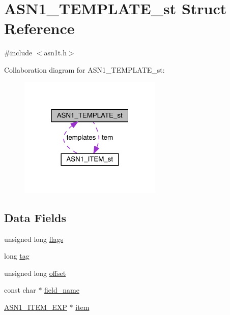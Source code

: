 \hypertarget{struct_a_s_n1___t_e_m_p_l_a_t_e__st}{}\section{A\+S\+N1\+\_\+\+T\+E\+M\+P\+L\+A\+T\+E\+\_\+st Struct Reference}
\label{struct_a_s_n1___t_e_m_p_l_a_t_e__st}


{\ttfamily \#include $<$asn1t.\+h$>$}



Collaboration diagram for A\+S\+N1\+\_\+\+T\+E\+M\+P\+L\+A\+T\+E\+\_\+st\+:\nopagebreak
\begin{figure}[H]
\begin{center}
\leavevmode
\includegraphics[width=193pt]{struct_a_s_n1___t_e_m_p_l_a_t_e__st__coll__graph}
\end{center}
\end{figure}
\subsection*{Data Fields}
\begin{DoxyCompactItemize}
\item 
unsigned long \hyperlink{struct_a_s_n1___t_e_m_p_l_a_t_e__st_a9e339c2784bd040b26a5112866700bff}{flags}
\item 
long \hyperlink{struct_a_s_n1___t_e_m_p_l_a_t_e__st_ae10c29173f0af40507d7e787905c7130}{tag}
\item 
unsigned long \hyperlink{struct_a_s_n1___t_e_m_p_l_a_t_e__st_ac1369a1f209735864674d22517edfa76}{offset}
\item 
const char $\ast$ \hyperlink{struct_a_s_n1___t_e_m_p_l_a_t_e__st_a40e17d0dbb56e424e8512e1da655be9f}{field\+\_\+name}
\item 
\hyperlink{crypto_2asn1_2asn1_8h_a66f9dbfa70a439af388cb82e0c764944}{A\+S\+N1\+\_\+\+I\+T\+E\+M\+\_\+\+E\+XP} $\ast$ \hyperlink{struct_a_s_n1___t_e_m_p_l_a_t_e__st_a42a630b2aafde4990b7b0717f4d2538d}{item}
\end{DoxyCompactItemize}


